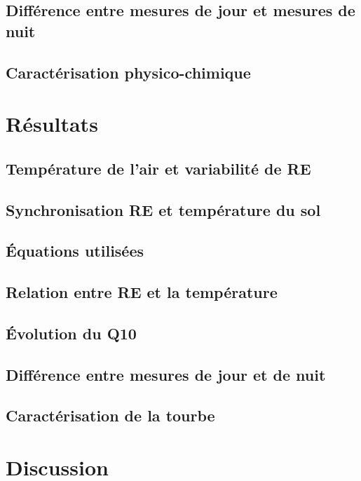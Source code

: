 \subsection{Différence entre mesures de jour et mesures de nuit}

\subsection{Caractérisation physico-chimique}

\section{Résultats}

\subsection{Température de l'air et variabilité de RE}

\subsection{Synchronisation RE et température du sol}

\subsection{Équations utilisées}

\subsection{Relation entre RE et la température}

\subsection{Évolution du Q10}

\subsection{Différence entre mesures de jour et de nuit}

\subsection{Caractérisation de la tourbe}

\section{Discussion}

